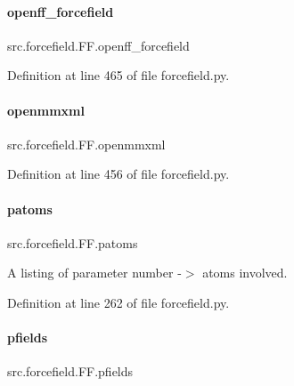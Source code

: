 \paragraph{\texorpdfstring{openff\+\_\+forcefield}{openff\_forcefield}}
{\footnotesize\ttfamily src.\+forcefield.\+F\+F.\+openff\+\_\+forcefield}



Definition at line 465 of file forcefield.\+py.

\mbox{\label{classsrc_1_1forcefield_1_1FF_a99c2a023158e63366935ba00d7c184dd}} 
\paragraph{\texorpdfstring{openmmxml}{openmmxml}}
{\footnotesize\ttfamily src.\+forcefield.\+F\+F.\+openmmxml}



Definition at line 456 of file forcefield.\+py.

\mbox{\label{classsrc_1_1forcefield_1_1FF_abb9238d4cdfc53e906ce930590505662}} 
\paragraph{\texorpdfstring{patoms}{patoms}}
{\footnotesize\ttfamily src.\+forcefield.\+F\+F.\+patoms}



A listing of parameter number -\/$>$ atoms involved. 



Definition at line 262 of file forcefield.\+py.

\mbox{\label{classsrc_1_1forcefield_1_1FF_a969afaf2339d5323370c6683224c7982}} 
\paragraph{\texorpdfstring{pfields}{pfields}}
{\footnotesize\ttfamily src.\+forcefield.\+F\+F.\+pfields}



